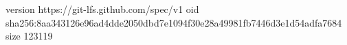 version https://git-lfs.github.com/spec/v1
oid sha256:8aa343126e96ad4dde2050dbd7e1094f30e28a49981fb7446d3e1d54adfa7684
size 123119
